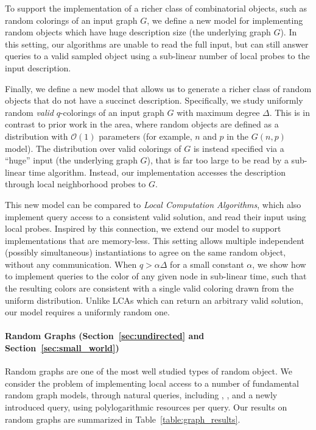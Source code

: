 To support the implementation of a richer class of combinatorial objects, such as random colorings of an input graph $G$,
we define a new model for implementing random objects which have huge description size (the underlying graph $G$).
In this setting, our algorithms are unable to read the full input,
but can still answer queries to a valid sampled object using a sub-linear number of local probes to the input description.

Finally, we define a new model that allows us to generate a richer class of random objects that do not have a succinct description.
Specifically, we study uniformly random \emph{valid} $q$-colorings of an input graph $G$ with maximum degree $\Delta$.
This is in contrast to prior work in the area, where random objects are defined as a distribution with $\mathcal O(1)$ parameters
(for example, $n$ and $p$ in the $G(n,p)$ model).
The distribution over valid colorings of $G$ is instead specified via a ``huge'' input (the underlying graph $G$),
that is far too large to be read by a sub-linear time algorithm.
Instead, our implementation accesses the description through local neighborhood probes to $G$.

This new model can be compared to \emph{Local Computation Algorithms}, which also implement query access to a consistent valid solution,
and read their input using local probes.
Inspired by this connection, we extend our model to support implementations that are memory-less.
This setting allows multiple independent (possibly simultaneous) instantiations to agree on the same random object, without any communication.
When $q > \alpha\Delta$ for a small constant $\alpha$, we show how to implement queries to the color of any given node in sub-linear time,
such that the resulting colors are consistent with a single valid coloring drawn from the uniform distribution.
Unlike LCAs which can return an arbitrary valid solution, our model requires a uniformly random one.





\paragraph*{Random Graphs (Section~\ref{sec:undirected} and Section~\ref{sec:small_world})}%
\label{par:random_graphs}
Random graphs are one of the most well studied types of random object.
We consider the problem of implementing local access to a number of fundamental random graph models,
through natural queries, including , ,
and a newly introduced  query, using polylogarithmic resources per query.
Our results on random graphs are summarized in Table~\ref{table:graph_results}.

